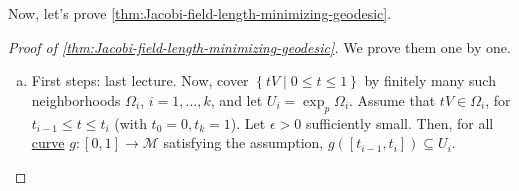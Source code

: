 Now, let's prove \autoref{thm:Jacobi-field-length-minimizing-geodesic}.
\begin{proof}[Proof of \autoref{thm:Jacobi-field-length-minimizing-geodesic}]
	We prove them one by one.
	\begin{enumerate}[(a)]
		\item First steps: last lecture. Now, cover \(\left\{ tV \mid 0 \leq t \leq 1 \right\} \) by finitely many such neighborhoods \(\Omega _i\), \(i = 1, \dots , k\), and let \(U_i = \exp _p \Omega _i\). Assume that \(tV\in \Omega _i\), for \(t_{i-1} \leq t \leq t_i\) (with \(t_0 = 0, t_k = 1\)). Let \(\epsilon > 0\) sufficiently small. Then, for all \hyperref[def:curve]{curve} \(g\colon [0, 1] \to \mathcal{M} \) satisfying the assumption, \(g([t_{i-1}, t_i]) \subseteq U_i\).


\end{enumerate}
\end{proof}
